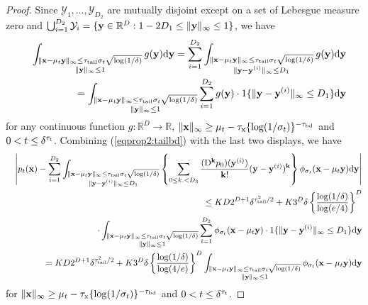 \documentclass[twoside,11pt]{article}
\def\cY{\mathcal Y}
\newcommand{\bk}{{\bf k}}
\newcommand{\bx}{{\bf x}}
\newcommand{\by}{{\bf y}}
\newcommand{\bbR}{{\mathbb R}}
\newcommand{\bean}{\setlength\arraycolsep{1pt}\begin{eqnarray*}}
\newcommand{\eean}{\end{eqnarray*}}
\def\d{{\rm d}}
\def\D{{\rm D}}
\begin{document}
\begin{proof}
Since $\cY_1,\ldots,\cY_{D_{2}}$ are mutually disjoint except on a set of Lebesgue measure zero and $ \bigcup_{i=1}^{D_{2}} \cY_i = \{\by \in \bbR^{D}: 1- 2 D_{1} \leq  \| \by \|_{\infty} \leq 1 \}$, we have
\bean
&& \int_{ \substack{ \| \bx-\mu_{t}\by \|_{\infty} \leq \tau_{\rm tail} \sigma_{t} \sqrt{ \log ( 1 / \delta ) }
\\ \| \by  \|_{\infty} \leq 1}} g(\by) \d \by
= \sum_{i=1}^{D_{2}} \int_{ \substack{ \| \bx-\mu_{t}\by \|_{\infty} \leq \tau_{\rm tail} \sigma_{t} \sqrt{ \log ( 1 / \delta ) }
\\ \| \by - \by^{(i)}  \|_{\infty} \leq D_{1} }} g(\by) \d \by
\\
&& = \int_{ \substack{ \| \bx-\mu_{t}\by \|_{\infty} \leq \tau_{\rm tail} \sigma_{t} \sqrt{ \log ( 1 / \delta ) }
\\ \|\by\|_{\infty} \leq 1  }}
\sum_{i=1}^{D_{2}} g(\by) \cdot 1\{ \| \by - \by^{(i)}  \|_{\infty} \leq D_{1} \} \d \by
\eean
for any continuous function $g : \bbR^{D} \to \bbR$,  $\|\bx\|_{\infty} \geq \mu_{t} - \tau_{\rm x} \{ \log (1/\sigma_{t}) \}^{-\tau_{\rm bd}}$ and $0 < t \leq \delta^{\tau_{\rm t}}$.
Combining (\ref{eqprop2:tailbd}) with the last two displays, we have
\bean
&& \left\vert p_t(\bx) - \sum_{i=1}^{D_{2}} \int_{ \substack{ \| \bx-\mu_{t}\by \|_{\infty} \leq \tau_{\rm tail} \sigma_{t} \sqrt{ \log ( 1 / \delta ) }
\\ \| \by - \by^{(i)} \|_{\infty} \leq D_{1}}}  \left\{ \sum_{0\leq k. < D_{3}} \frac{(\D^{\bk} p_0 )(\by^{(i)}) }{\bk !}   (\by - \by^{(i)})^{\bk} \right\} \phi_{\sigma_{t}}(\bx-\mu_{t} \by)  \d \by \right\vert
\\
 && \leq  K D 2^{D+1} \delta^{ \tau_{\rm tail}^2 / 2 } +  K3^{D} \delta \left\{ \frac{\log (1/\delta) }{\log (e/4)} \right\}^{D} 
 \\
 && \quad \cdot  \int_{ \substack{ \| \bx-\mu_{t}\by \|_{\infty} \leq \tau_{\rm tail} \sigma_{t} \sqrt{ \log ( 1 / \delta ) }
\\ \| \by  \|_{\infty} \leq 1}} \sum_{i=1}^{D_{2}}  \phi_{\sigma_{t}}(\bx-\mu_{t} \by) \cdot 1\{ \| \by - \by^{(i)} \|_{\infty} \leq D_{1} \}  \d \by   
\\
&& =  K D 2^{D+1} \delta^{ \tau_{\rm tail}^2 / 2 } + K  3^{D} \delta \left\{ \frac{\log (1/\delta) }{\log (4/e)} \right\}^{D} 
 \int_{ \substack{ \| \bx-\mu_{t}\by \|_{\infty} \leq \tau_{\rm tail} \sigma_{t} \sqrt{ \log ( 1 / \delta ) }
\\ \| \by  \|_{\infty} \leq 1}}  \phi_{\sigma_{t}}(\bx-\mu_{t} \by)  \d \by   
\eean
for $\|\bx\|_{\infty} \geq \mu_{t} - \tau_{\rm x} \{ \log (1/\sigma_{t}) \}^{-\tau_{\rm bd}}$ and $0 < t \leq \delta^{\tau_{\rm t}}$.

\end{proof}
\end{document}
